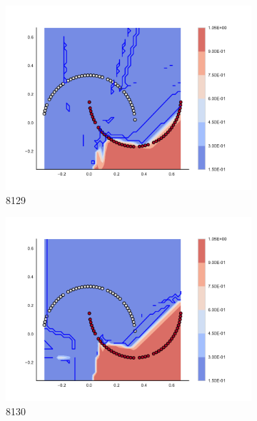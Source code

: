 \begin{figure}[h]
\begin{subfigure}[b]{0.09\textwidth}
    \includegraphics[clip, trim=2.35cm 1.75cm 4.5cm 0cm,width=\textwidth]{img/convergence/8129.pdf}
    \caption{8129}
    \label{fig:convergence_8129}
\end{subfigure}
%
\begin{subfigure}[b]{0.09\textwidth}
    \includegraphics[clip, trim=2.35cm 1.75cm 4.5cm 0cm,width=\textwidth]{img/convergence/8130.pdf}
    \caption{8130}
    \label{fig:convergence_8130}
\end{subfigure}
%
\begin{subfigure}[b]{0.09\textwidth}

\end{subfigure}
\end{figure}
